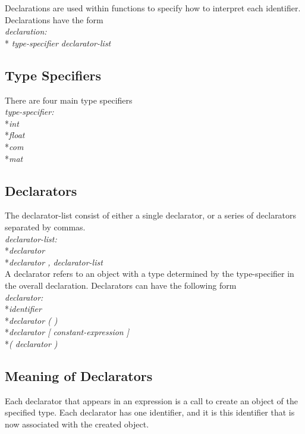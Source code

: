 Declarations are used within functions to specify how to interpret each identifier. Declarations have the form\\

	\textit{ declaration: }
		\\*\indent\indent\textit{ type-specifier declarator-list}

\subsection{Type Specifiers}

There are four main type specifiers\\

	\textit{type-specifier: }
		\\*\indent\indent\textit{int}
		\\*\indent\indent\textit{float}
		\\*\indent\indent\textit{com}
		\\*\indent\indent\textit{mat}

\subsection{Declarators}
The declarator-list consist of either a single declarator, or a series of declarators separated by commas.\\

	\textit{declarator-list:}
		\\*\indent\indent\textit{declarator}
		\\*\indent\indent\textit{declarator , declarator-list}\\

A declarator refers to an object with a type determined by the type-specifier in the overall declaration. Declarators can have the following form\\

	\textit{declarator:}
		\\*\indent\indent\textit{identifier}
		\\*\indent\indent\textit{declarator ( )}
		\\*\indent\indent\textit{declarator [ constant-expression ]}
		\\*\indent\indent\textit{( declarator )}\\

\subsection{ Meaning of Declarators }
Each declarator that appears in an expression is a call to create an object of the specified type. Each declarator has one identifier, and it is this identifier that is now associated with the created object. 

